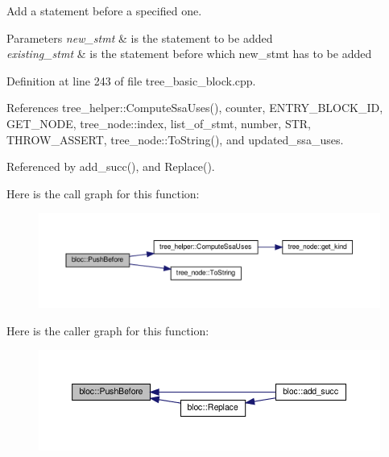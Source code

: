 Add a statement before a specified one. 


\begin{DoxyParams}{Parameters}
{\em new\+\_\+stmt} & is the statement to be added \\
\hline
{\em existing\+\_\+stmt} & is the statement before which new\+\_\+stmt has to be added \\
\hline
\end{DoxyParams}


Definition at line 243 of file tree\+\_\+basic\+\_\+block.\+cpp.



References tree\+\_\+helper\+::\+Compute\+Ssa\+Uses(), counter, E\+N\+T\+R\+Y\+\_\+\+B\+L\+O\+C\+K\+\_\+\+ID, G\+E\+T\+\_\+\+N\+O\+DE, tree\+\_\+node\+::index, list\+\_\+of\+\_\+stmt, number, S\+TR, T\+H\+R\+O\+W\+\_\+\+A\+S\+S\+E\+RT, tree\+\_\+node\+::\+To\+String(), and updated\+\_\+ssa\+\_\+uses.



Referenced by add\+\_\+succ(), and Replace().

Here is the call graph for this function\+:
\nopagebreak
\begin{figure}[H]
\begin{center}
\leavevmode
\includegraphics[width=350pt]{d6/df6/structbloc_a3ac7907a4422bb34f52206b6db4bf22f_cgraph}
\end{center}
\end{figure}
Here is the caller graph for this function\+:
\nopagebreak
\begin{figure}[H]
\begin{center}
\leavevmode
\includegraphics[width=350pt]{d6/df6/structbloc_a3ac7907a4422bb34f52206b6db4bf22f_icgraph}
\end{center}
\end{figure}
\mbox{\label{structbloc_ad0a606ca6ec3d5ae878d23925dea6276}} 
